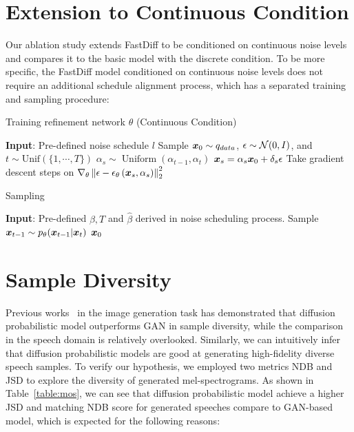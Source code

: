 \section{Extension to Continuous Condition} \label{appendix:extension}

Our ablation study extends FastDiff to be conditioned on continuous noise levels and compares it to the basic model with the discrete condition. To be more specific, the FastDiff model conditioned on continuous noise levels does not require an additional schedule alignment process, which has a separated training and sampling procedure: 

\begin{algorithm}[H]
    \centering
    \caption{Training refinement network $\theta$ (Continuous Condition)}
    \begin{algorithmic}[1]
    \vspace{-0.1cm}
    \STATE \textbf{Input}: Pre-defined noise schedule $l$
    \REPEAT 
    \STATE Sample ${\bm{x}}_{0} \sim q_{data}$, $\epsilon\sim{\mathcal{N}}(0,I)$, and \quad $t\sim\mathrm{Unif}(\{1,\cdots,T\})$
    \STATE $\alpha_s \sim \operatorname{Uniform}\left(\alpha_{t-1}, \alpha_{t}\right)$
    \STATE ${\bm{x}}_s = \alpha_{s} {\bm{x}}_{0}+ \delta_s \epsilon$
    \STATE Take gradient descent steps on $\nabla_{\theta}\left\|\epsilon-\epsilon_{\theta}\left({\bm{x}}_s, \alpha_s\right)\right\|_{2}^{2}$ 
    \vspace{0.09em}
    \end{algorithmic}
    \end{algorithm}

    \begin{algorithm}[H]
        \centering
        \caption{Sampling}
        \begin{algorithmic}[1]
        \STATE \textbf{Input}: Pre-defined $\beta, T$ and $\hat{\beta}$ derived in noise scheduling process.
        \STATE Sample ${\bm{x}}_{t-1}\sim p_{\theta}({\bm{x}}_{t-1}|{\bm{x}}_t)$
        \ENDFOR
        \RETURN ${\bm{x}}_0$
        \end{algorithmic}
        \end{algorithm}
        \vspace{-2mm}


\section{Sample Diversity} \label{appendix:diversity}
Previous works~\cite{dhariwal2021diffusion,xiao2021tackling} in the image generation task has demonstrated that diffusion probabilistic model outperforms GAN in sample diversity, while the comparison in the speech domain is relatively overlooked. Similarly, we can intuitively infer that diffusion probabilistic models are good at generating high-fidelity diverse speech samples. To verify our hypothesis, we employed two metrics NDB and JSD to explore the diversity of generated mel-spectrograms. As shown in Table~\ref{table:mos}, we can see that diffusion probabilistic model achieve a higher JSD and matching NDB score for generated speeches compare to GAN-based model, which is expected for the following reasons:

